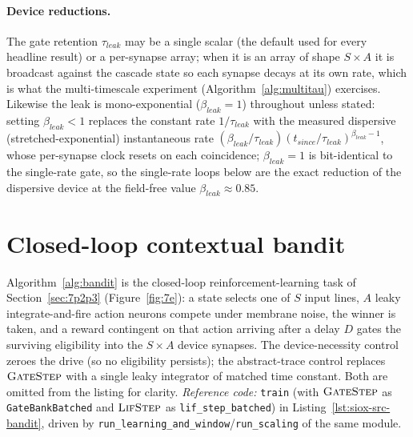 \paragraph{Device reductions.} The gate retention $\tau_{leak}$ may be a single scalar
(the default used for every headline result) or a per-synapse array; when it is an array
of shape $S\times A$ it is broadcast against the cascade state so each synapse decays at
its own rate, which is what the multi-timescale experiment
(Algorithm~\ref{alg:multitau}) exercises. Likewise the leak is mono-exponential
($\beta_{leak}\!=\!1$) throughout unless stated: setting $\beta_{leak}\!<\!1$ replaces the
constant rate $1/\tau_{leak}$ with the measured dispersive (stretched-exponential)
instantaneous rate $(\beta_{leak}/\tau_{leak})(t_{since}/\tau_{leak})^{\beta_{leak}-1}$,
whose per-synapse clock resets on each coincidence; $\beta_{leak}\!=\!1$ is bit-identical
to the single-rate gate, so the single-rate loops below are the exact reduction of the
dispersive device at the field-free value $\beta_{leak}\!\approx\!0.85$.

\section{Closed-loop contextual bandit}
\label{app:alg-bandit}

\noindent Algorithm~\ref{alg:bandit} is the closed-loop reinforcement-learning task
of Section~\ref{sec:7p2p3} (Figure~\ref{fig:7e}): a state selects one of $S$ input
lines, $A$ leaky integrate-and-fire action neurons compete under membrane noise, the
winner is taken, and a reward contingent on that action arriving after a delay $D$
gates the surviving eligibility into the $S\times A$ device synapses. The
device-necessity control zeroes the drive (so no eligibility persists); the
abstract-trace control replaces $\textsc{GateStep}$ with a single leaky integrator of
matched time constant. Both are omitted from the listing for clarity. \emph{Reference
code:} \texttt{train} (with $\textsc{GateStep}$ as \texttt{GateBankBatched} and
$\textsc{LifStep}$ as \texttt{lif\_step\_batched}) in Listing~\ref{lst:siox-src-bandit},
driven by \texttt{run\_learning\_and\_window}/\texttt{run\_scaling} of the same module.

